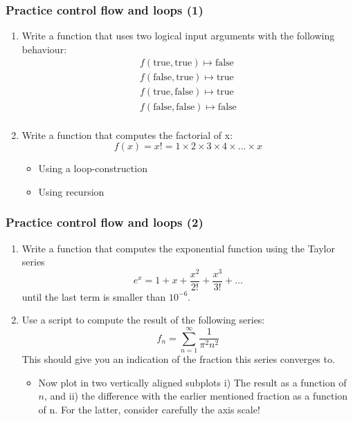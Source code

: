  \begin{frame}[fragile]
  \frametitle{Practice control flow and loops (1)}
  \begin{enumerate}
    \item Write a function that uses two logical input arguments with the following behaviour:
    \begin{align*}
       f(\text{true},\text{true}) \mapsto \text{false} \\
      f(\text{false},\text{true}) \mapsto \text{true} \\ 
      f(\text{true},\text{false}) \mapsto \text{true} \\
      f(\text{false},\text{false}) \mapsto \text{false} \\
    \end{align*}
    \item Write a function that computes the factorial of x:
    \[ f(x) = x! = 1 \times 2 \times 3 \times 4 \times \ldots \times x \]
    \begin{itemize}
      \item Using a loop-construction
      \item Using recursion
    \end{itemize}
  \end{enumerate}
 \end{frame}

 \begin{frame}[fragile]
  \frametitle{Practice control flow and loops (2)}
  \begin{enumerate}
    \item Write a function that computes the exponential function using the Taylor series
    \[  e^x = 1 + x + \frac{x^2}{2!} + \frac{x^3}{3!} + \ldots \]
    until the last term is smaller than $10^{-6}$.
    \item Use a script to compute the result of the following series:
    \[
      f_n = \sum_{n=1}^{\infty} \frac{1}{\pi^2 n^2}
    \]
    This should give you an indication of the fraction this series converges to.
    \begin{itemize}
      \item Now plot in two vertically aligned subplots i) The result as a function of $n$, and ii) the difference with the earlier mentioned fraction as a function of n. For the latter, consider carefully the axis scale!
    \end{itemize}
  \end{enumerate}
 \end{frame}


